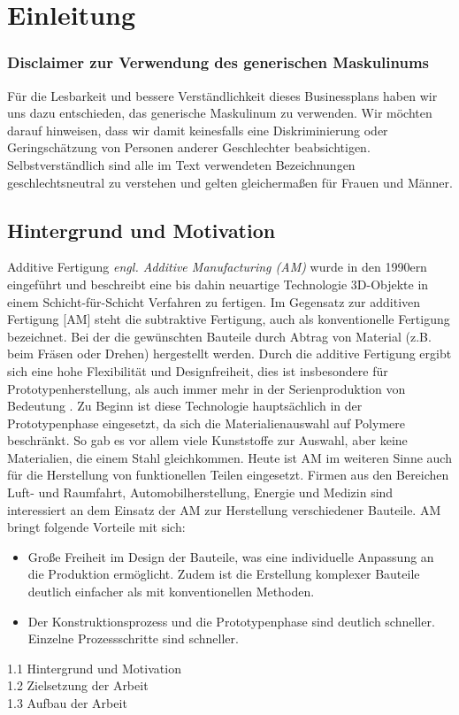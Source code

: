 \chapter{Einleitung}
\label{einleitung}

\subsection*{Disclaimer zur Verwendung des generischen Maskulinums}
Für die Lesbarkeit und bessere Verständlichkeit dieses Businessplans haben wir uns dazu entschieden, das generische Maskulinum zu verwenden. Wir möchten darauf hinweisen, dass wir damit keinesfalls eine Diskriminierung oder Geringschätzung von Personen anderer Geschlechter beabsichtigen. Selbstverständlich sind alle im Text verwendeten Bezeichnungen geschlechtsneutral zu verstehen und gelten gleichermaßen für Frauen und Männer.

\pagebreak

\section{Hintergrund und Motivation}
Additive Fertigung \textit{engl. Additive Manufacturing (AM)} wurde in den 1990ern eingeführt und beschreibt eine bis dahin neuartige Technologie 3D-Objekte in einem Schicht-für-Schicht Verfahren zu fertigen. Im Gegensatz zur additiven Fertigung [AM] steht die subtraktive Fertigung, auch als konventionelle Fertigung bezeichnet. Bei der die gewünschten Bauteile durch Abtrag von Material (z.B. beim Fräsen oder Drehen) hergestellt werden. Durch die additive Fertigung ergibt sich eine hohe Flexibilität und Designfreiheit, dies ist insbesondere für Prototypenherstellung, als auch immer mehr in der Serienproduktion von Bedeutung \autocite{Prof.Dr.Ing.ChristianSeidel.2023}.
Zu Beginn ist diese Technologie hauptsächlich in der Prototypenphase eingesetzt, da sich die Materialienauswahl auf Polymere beschränkt. So gab es vor allem viele Kunststoffe zur Auswahl, aber keine Materialien, die einem Stahl gleichkommen.
Heute ist AM im weiteren Sinne auch für die Herstellung von funktionellen Teilen eingesetzt.  Firmen aus den Bereichen Luft- und Raumfahrt, Automobilherstellung, Energie und Medizin sind interessiert an dem Einsatz der AM zur Herstellung verschiedener Bauteile.
AM bringt folgende Vorteile mit sich:
\begin{itemize}
    \item Große Freiheit im Design der Bauteile, was eine individuelle Anpassung an die Produktion ermöglicht. Zudem ist die Erstellung komplexer Bauteile deutlich einfacher als mit konventionellen Methoden.
    \item Der Konstruktionsprozess und die Prototypenphase sind deutlich schneller. Einzelne Prozessschritte sind schneller.
\end{itemize}

1.1 Hintergrund und Motivation\\
1.2 Zielsetzung der Arbeit\\
1.3 Aufbau der Arbeit